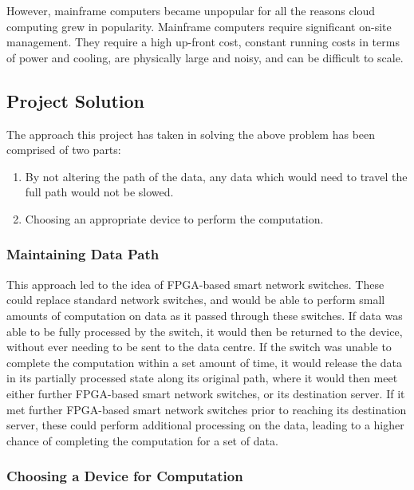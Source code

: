 However, mainframe computers became unpopular for all the reasons cloud computing grew in popularity. Mainframe computers require significant on-site management. They require a high up-front cost, constant running costs in terms of power and cooling, are physically large and noisy, and can be difficult to scale.

\subsection{Project Solution}
\label{project_solution}


The approach this project has taken in solving the above problem has been comprised of two parts:
\begin{enumerate}
  \item By not altering the path of the data, any data which would need to travel the full path would not be slowed.
  \item Choosing an appropriate device to perform the computation.
\end{enumerate}

\subsubsection{Maintaining Data Path}

This approach led to the idea of FPGA-based smart network switches. These could replace standard network switches, and would be able to perform small amounts of computation on data as it passed through these switches. If data was able to be fully processed by the switch, it would then be returned to the device, without ever needing to be sent to the data centre. If the switch was unable to complete the computation within a set amount of time, it would release the data in its partially processed state along its original path, where it would then meet either further FPGA-based smart network switches, or its destination server. If it met further FPGA-based smart network switches prior to reaching its destination server, these could perform additional processing on the data, leading to a higher chance of completing the computation for a set of data.

\subsubsection{Choosing a Device for Computation}

